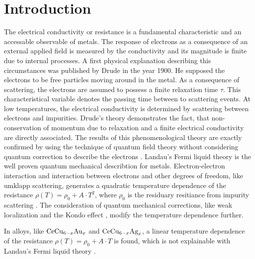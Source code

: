 %
%
\chapter{Introduction}
\label{ch:introduction}
%
%
The electrical conductivity or resistance is a fundamental characteristic and an accessable observable of metals.
The response of electrons as a consequence of an external applied field is measured by the conductivity and its magnitude is finite due to internal processes.
A first physical explanation describing this circumstances was published by Drude \cite{Drude} in the year 1900.
He supposed the electrons to be free particles moving around in the metal.
As a consequence of scattering, the electrons are assumed to possess a finite relaxation time $\tau$.
This characteristical variable denotes the passing time between to scattering events.
At low temperatures, the electrical conductivity is determined by scattering between electrons and impurities.
Drude's theory demonstrates the fact, that non-conservation of momentum due to relaxation and a finite electrical conductivity are directly associated.
The results of this phenomenological theory are exactly confirmed by using the technique of quantum field theory without considering quantum correction to describe the electrons \cite{Bruus&Flensberg}.
Landau's Fermi liquid theory is the well proven quantum mechanical describtion for metals.
Electron-electron interaction and interaction between electrons and other degrees of freedom, like umklapp scattering, generates a quadratic temperature dependence of the resistance $\rho(T) = \rho_{0} + A \cdot T^{2}$, where $\rho_{0}$ is the residuary resitiance from impurity scattering \cite{Bader,Pal}.
The consideration of quantum mechanical corrections, like weak localization \cite{Altshuler} and the Kondo effect \cite{Kondo}, modify the temperature dependence further.

In alloys, like $\mathrm{CeCu}_{6-x}\mathrm{Au}_{x}$ and $\mathrm{CeCu}_{6-x}\mathrm{Ag}_{x}$, a linear temperature dependence of the resistance $\rho(T) = \rho_{0} + A \cdot T$ is found, which is not explainable with Landau's Fermi liquid theory \cite{Loehneysen}.


































